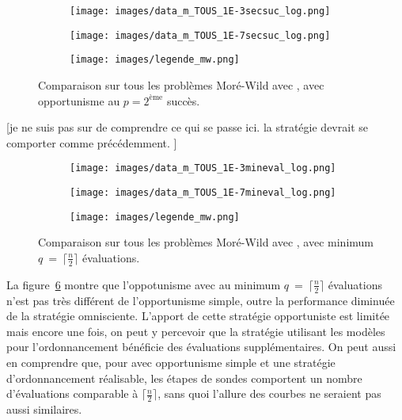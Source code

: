 \begin{figure}[!htb]
	\centering
	\begin{subfigure}{0.43\textwidth}
		\texttt{[image: images/data\_m\_TOUS\_1E-3secsuc\_log.png]}
		\label{fig:data_m_TOUS_1E-3secsuc_log}
	\end{subfigure}%
	\begin{subfigure}{0.43\textwidth}
		\texttt{[image: images/data\_m\_TOUS\_1E-7secsuc\_log.png]}
		\label{fig:data_m_TOUS_1E-7secsuc_log}
	\end{subfigure}
	\smallskip
	\begin{subfigure}{0.95\textwidth}
		\texttt{[image: images/legende\_mw.png]}
	\end{subfigure}
	\caption{Comparaison sur tous les problèmes Moré-Wild avec \MADS, avec opportunisme au $p=2^{\text{ème}}$ succès.}
	\label{fig:mads_mw_secsuc}
\end{figure}

[je ne suis pas sur de comprendre ce qui se passe ici. la stratégie devrait se comporter comme précédemment. ]

\begin{figure}[!htb]
	\centering
	\begin{subfigure}{0.43\textwidth}
		\texttt{[image: images/data\_m\_TOUS\_1E-3mineval\_log.png]}
		\label{fig:data_m_TOUS_1E-3mineval_log}
	\end{subfigure}%
	\begin{subfigure}{0.43\textwidth}
		\texttt{[image: images/data\_m\_TOUS\_1E-7mineval\_log.png]}
		\label{fig:data_m_TOUS_1E-7mineval_log}
	\end{subfigure}
	\smallskip
	\begin{subfigure}{0.95\textwidth}
		\texttt{[image: images/legende\_mw.png]}
	\end{subfigure}
	\caption{Comparaison sur tous les problèmes Moré-Wild avec \MADS, avec minimum $q~=~\lceil\frac{n}{2}\rceil$ évaluations.} 
	\label{fig:mads_mw_mineval}
\end{figure} 

La figure~\ref{fig:mads_mw_mineval} montre que l'oppotunisme avec au minimum $q~=~\lceil\frac{n}{2}\rceil$ évaluations n'est pas très différent de l'opportunisme simple, outre la performance diminuée de la stratégie omnisciente. L'apport de cette stratégie opportuniste est limitée mais encore une fois, on peut y percevoir que la stratégie utilisant les modèles pour l'ordonnancement bénéficie des évaluations supplémentaires. On peut aussi en comprendre que, pour \MADS avec opportunisme simple et une stratégie d'ordonnancement réalisable, les étapes de sondes comportent un nombre d'évaluations comparable à $\lceil\frac{n}{2}\rceil$, sans quoi l'allure des courbes ne seraient pas aussi similaires.

